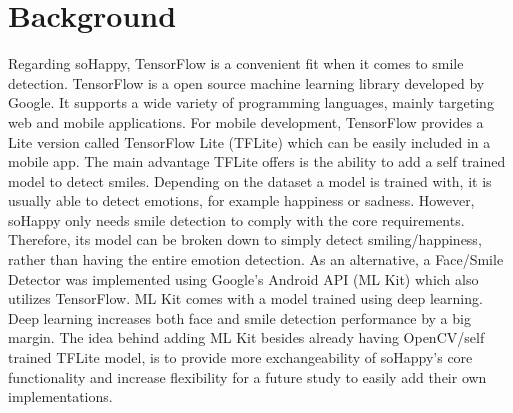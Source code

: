 \section{Background} \label{sec:background}
Regarding soHappy, TensorFlow \cite{tensorflow} is a convenient fit when it comes to smile detection.
TensorFlow is a open source machine learning library developed by Google.
It supports a wide variety of programming languages, mainly targeting web and mobile applications.
For mobile development, TensorFlow provides a Lite version called TensorFlow Lite (TFLite) which can be easily included in a mobile app.
The main advantage TFLite offers is the ability to add a self trained model to detect smiles.
Depending on the dataset a model is trained with, it is usually able to detect emotions, for example happiness or sadness.
However, soHappy only needs smile detection to comply with the core requirements.
Therefore, its model can be broken down to simply detect smiling/happiness, rather than having the entire emotion detection.
As an alternative, a Face/Smile Detector was implemented using Google's Android API (ML Kit) \cite{mlkit} which also utilizes TensorFlow.
ML Kit comes with a model trained using deep learning.
Deep learning increases both face and smile detection performance by a big margin.
The idea behind adding ML Kit besides already having OpenCV/self trained TFLite model, is to provide more exchangeability of soHappy's core functionality and increase flexibility for a future study to easily add their own implementations.
